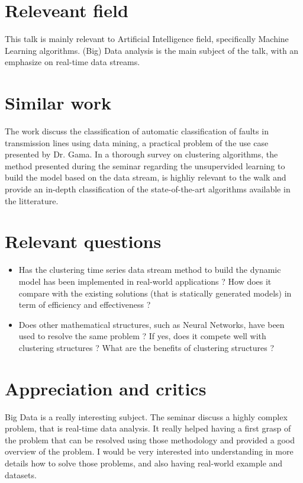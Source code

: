 \documentclass[11pt,a4paper]{article}
\begin{document}
\section{Releveant field}

This talk is mainly relevant to Artificial Intelligence field, specifically Machine Learning algorithms. (Big) Data analysis is the main subject of the talk, with an emphasize on real-time data streams.

\section{Similar work}


The work  discuss the classification of automatic classification of faults in transmission lines using data mining, a practical problem of the use case presented by Dr. Gama. In  a thorough survey on clustering algorithms, the method presented during the seminar regarding the unsupervided learning to build the model based on the data stream, is highliy relevant to the walk and provide an in-depth classification of the state-of-the-art algorithms available in the litterature.

\section{Relevant questions}

\begin{itemize}
  \item Has the clustering time series data stream method to build the dynamic model has been implemented in real-world applications ? How does it compare with the existing solutions (that is statically generated models) in term of efficiency and effectiveness ?
  \item Does other mathematical structures, such as Neural Networks, have been used to resolve the same problem ? If yes, does it compete well with clustering structures ? What are the benefits of clustering structures ?
\end{itemize}

\section{Appreciation and critics}

Big Data is a really interesting subject. The seminar discuss a highly complex problem, that is real-time data analysis. It really helped having a first grasp of the problem that can be resolved using those methodology and provided a good overview of the problem. I would be very interested into understanding in more details how to solve those problems, and also having real-world example and datasets.
\end{document}
